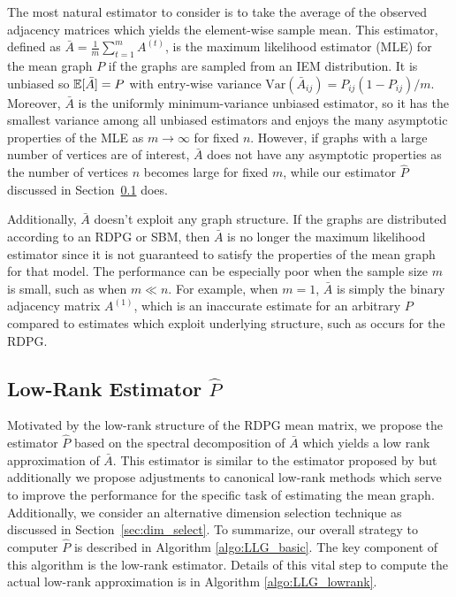 The most natural estimator to consider is to take the average of the observed adjacency matrices which yields the element-wise sample mean.
This estimator, defined as $\bar{A}=\frac{1}{m}\sum_{t=1}^m A^{(t)}$, is the  maximum likelihood estimator (MLE) for the mean graph $P$ if the graphs are sampled from an IEM distribution.
It is unbiased so $\mathbb{E}[\bar{A}]=P$ with entry-wise variance $\mathrm{Var}(\bar{A}_{ij}) = P_{ij} (1-P_{ij})/m$. Moreover, $\bar{A}$ is the uniformly minimum-variance unbiased estimator, so it has the smallest variance among all unbiased estimators and enjoys the many asymptotic properties of the MLE as $m\to \infty$ for fixed $n$.
However, if graphs with a large number of vertices are of interest, $\bar{A}$ does not have any asymptotic properties as the number of vertices $n$ becomes large for fixed $m$, while our estimator $\hat{P}$ discussed in Section~\ref{sec:LLG_phat} does.

Additionally, $\bar{A}$ doesn't exploit any graph structure.
If the graphs are distributed according to an RDPG or SBM, then $\bar{A}$ is no longer the maximum likelihood estimator since it is not guaranteed to satisfy the properties of the mean graph for that model.
The performance can be especially poor when the sample size $m$ is small, such as when $m \ll n$.
For example, when $m = 1$, $\bar{A}$ is simply the binary adjacency matrix $A^{(1)}$, which is an inaccurate estimate for an arbitrary $P$ compared to estimates which exploit underlying structure, such as occurs for the RDPG.



\subsection[Low-Rank Estimator]{Low-Rank Estimator $\hat{P}$}
\label{sec:LLG_phat}

Motivated by the low-rank structure of the RDPG mean matrix, we propose the estimator $\hat{P}$ based on the spectral decomposition of $\bar{A}$ which yields a low rank approximation of $\bar{A}$.
This estimator is similar to the estimator proposed by \citet{chatterjee2015matrix} but additionally
we propose adjustments to canonical low-rank methods which serve to improve the performance for the specific task of estimating the mean graph. 
Additionally, we consider an alternative dimension selection technique as discussed in Section~\ref{sec:dim_select}.
To summarize, our overall strategy to computer $\hat{P}$ is described in Algorithm \ref{algo:LLG_basic}. The key component of this algorithm is the low-rank estimator. Details of this vital step to compute the actual low-rank approximation is in Algorithm \ref{algo:LLG_lowrank}.

